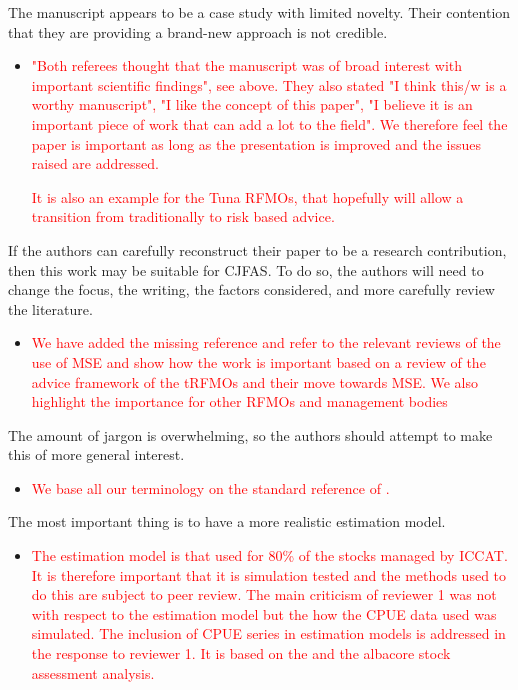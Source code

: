 \documentclass[a4paper,10pt]{article}
\newcommand{\red}{\textcolor{red}}
\begin{document}
 The manuscript appears to be a case study with limited novelty. Their contention that they are providing a brand-new approach is not credible.
 \begin{itemize}
    \item  \red{"Both referees thought that the manuscript was of broad interest with important scientific findings", see above. They also stated "I think this/w is a worthy manuscript", "I like the concept of this paper", "I believe it is an important piece of work that can add a lot to the field". We therefore feel the paper is important as long as the presentation is improved and the issues raised are addressed.}
    
     \red{It is also an example for the Tuna RFMOs, that hopefully will allow a transition from traditionally to risk based advice.}
  \end{itemize}
 
If the authors can carefully reconstruct their paper to be a research contribution, then this work may be suitable for CJFAS. To do so, the authors will need to change the focus, the writing, the factors considered, and more carefully review the literature.  

\begin{itemize}
    \item  \red{We have added the missing reference and refer to the relevant reviews of the use of MSE and show how the work is important based on a review of the advice framework of the tRFMOs and their move towards MSE. We also highlight the importance for other RFMOs and management bodies}
  \end{itemize}
 
 The amount of jargon is overwhelming, so the authors should attempt to make this of more general interest.  \begin{itemize}
    \item  \red{We base all our terminology on the standard reference of \cite[][]{rademeyer2007tips}.}
  \end{itemize}
  
 The most important thing is to have a more realistic estimation model.
 \begin{itemize}
    \item  \red{The estimation model is that used for 80\% of the stocks managed by ICCAT. It is therefore important that it is simulation tested and the methods used to do this are subject to peer review. The main criticism of reviewer 1 was not with respect to the estimation model but the how the CPUE data used was simulated. The inclusion of CPUE series in estimation models is addressed in the response to reviewer 1. It is based on the \cite{hillary2015scientific} and the albacore stock assessment analysis.} 
  \end{itemize}
 
\end{document}
